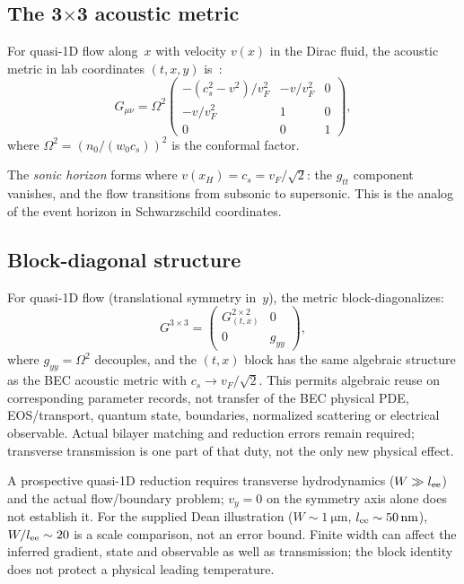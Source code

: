 \documentclass[aps,prd,twocolumn,showpacs,superscriptaddress,nofootinbib]{revtex4-2}
\begin{document}
\subsection{The 3$\times$3 acoustic metric}

For quasi-1D flow along~$x$ with velocity $v(x)$ in the Dirac fluid, the
acoustic metric in lab coordinates $(t, x, y)$ is~\cite{Bilic1999}:
\begin{equation}
G_{\mu\nu} = \Omega^2
\begin{pmatrix}
-(c_s^2 - v^2)/v_F^2 & -v/v_F^2 & 0 \\
-v/v_F^2 & 1 & 0 \\
0 & 0 & 1
\end{pmatrix},
\label{eq:metric}
\end{equation}
where $\Omega^2 = (n_0/(w_0 c_s))^2$ is the conformal factor.

The \emph{sonic horizon} forms where $v(x_H) = c_s = v_F/\sqrt{2}$: the
$g_{tt}$ component vanishes, and the flow transitions from subsonic to
supersonic. This is the analog of the event horizon in Schwarzschild
coordinates.

\subsection{Block-diagonal structure}

For quasi-1D flow (translational symmetry in~$y$), the metric
block-diagonalizes:
\begin{equation}
G^{3\times 3} = \begin{pmatrix}
G^{2\times 2}_{(t,x)} & 0 \\ 0 & g_{yy}
\end{pmatrix},
\end{equation}
where $g_{yy} = \Omega^2$ decouples, and the $(t,x)$ block has the same
algebraic structure as the BEC acoustic metric with $c_s \to v_F/\sqrt{2}$.
This permits algebraic reuse on corresponding parameter records, not
transfer of the BEC physical PDE, EOS/transport, quantum state, boundaries,
normalized scattering or electrical observable. Actual bilayer matching
and reduction errors remain required; transverse transmission is one
part of that duty, not the only new physical effect.

A prospective quasi-1D reduction requires transverse hydrodynamics
($W\gg l_{\rm ee}$) and the actual flow/boundary problem; $v_y=0$ on
the symmetry axis alone does not establish it. For the supplied Dean
illustration ($W\sim\SI{1}{\micro\meter}$,
$l_{\rm ee}\sim\SI{50}{\nano\meter}$), $W/l_{\rm ee}\sim20$ is a
scale comparison, not an error bound. Finite width can affect the
inferred gradient, state and observable as well as transmission; the
block identity does not protect a physical leading temperature.
\end{document}
